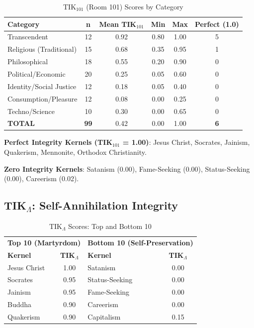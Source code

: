 \documentclass[11pt,a4paper]{article}
\theoremstyle{definition}
\theoremstyle{remark}
\begin{document}
\begin{table}[H]
\centering
\caption{TIK$_{101}$ (Room 101) Scores by Category}
\label{tab:tik101-results}
\begin{tabular}{@{}lccccc@{}}
\toprule
\textbf{Category} & \textbf{n} & \textbf{Mean TIK$_{101}$} & \textbf{Min} & \textbf{Max} & \textbf{Perfect (1.0)} \\
\midrule
Transcendent & 12 & 0.92 & 0.80 & 1.00 & 5 \\
Religious (Traditional) & 15 & 0.68 & 0.35 & 0.95 & 1 \\
Philosophical & 18 & 0.55 & 0.20 & 0.90 & 0 \\
Political/Economic & 20 & 0.25 & 0.05 & 0.60 & 0 \\
Identity/Social Justice & 12 & 0.18 & 0.05 & 0.40 & 0 \\
Consumption/Pleasure & 12 & 0.08 & 0.00 & 0.25 & 0 \\
Techno/Science & 10 & 0.30 & 0.00 & 0.65 & 0 \\
\midrule
\textbf{TOTAL} & \textbf{99} & 0.42 & 0.00 & 1.00 & \textbf{6} \\
\bottomrule
\end{tabular}
\end{table}

\textbf{Perfect Integrity Kernels (TIK$_{101}$ = 1.00)}: Jesus Christ, Socrates, Jainism, Quakerism, Mennonite, Orthodox Christianity.

\textbf{Zero Integrity Kernels}: Satanism (0.00), Fame-Seeking (0.00), Status-Seeking (0.00), Careerism (0.02).

\subsection{TIK$_\Lambda$: Self-Annihilation Integrity}

\begin{table}[H]
\centering
\caption{TIK$_\Lambda$ Scores: Top and Bottom 10}
\label{tab:tikinfinity-results}
\begin{tabular}{@{}lc|lc@{}}
\toprule
\multicolumn{2}{c|}{\textbf{Top 10 (Martyrdom)}} & \multicolumn{2}{c}{\textbf{Bottom 10 (Self-Preservation)}} \\
\textbf{Kernel} & \textbf{TIK$_\Lambda$} & \textbf{Kernel} & \textbf{TIK$_\Lambda$} \\
\midrule
Jesus Christ & 1.00 & Satanism & 0.00 \\
Socrates & 0.95 & Status-Seeking & 0.00 \\
Jainism & 0.95 & Fame-Seeking & 0.00 \\
Buddha & 0.90 & Careerism & 0.00 \\
Quakerism & 0.90 & Capitalism & 0.15 \\
\bottomrule
\end{tabular}
\end{table}
\end{document}
